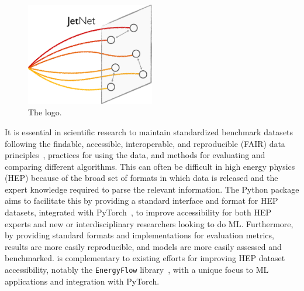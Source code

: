 \section{\jetnet}
\label{sec:06_jetnet_jetnet}

\begin{figure}[ht!]
    \centering
    \captionsetup{justification=centering}
    \includegraphics[width=0.5\textwidth]{figures/06-ML4Jets/jetnetlogo.pdf}
    \caption{The \jetnet logo.}
    \label{fig:06_jetnet_logo}
\end{figure}


It is essential in scientific research to maintain standardized benchmark datasets following the findable, accessible, interoperable, and reproducible (FAIR) data principles~\cite{Chen:2021euv}, practices for using the data, and methods for evaluating and comparing different algorithms.
This can often be difficult in high energy physics (HEP) because of the broad set of formats in which data is released and the expert knowledge required to parse the relevant information. 
The \jetnet Python package aims to facilitate this by providing a standard interface and format for HEP datasets, integrated with PyTorch~\cite{NEURIPS2019_9015}, to improve accessibility for both HEP experts and new or interdisciplinary researchers looking to do ML. 
Furthermore, by providing standard formats and implementations for evaluation metrics, results are more easily reproducible, and models are more easily assessed and benchmarked. 
\jetnet is complementary to existing efforts for improving HEP dataset accessibility, notably the \texttt{EnergyFlow} library~\cite{Komiske:2019jim}, with a unique focus to ML applications and integration with PyTorch.

